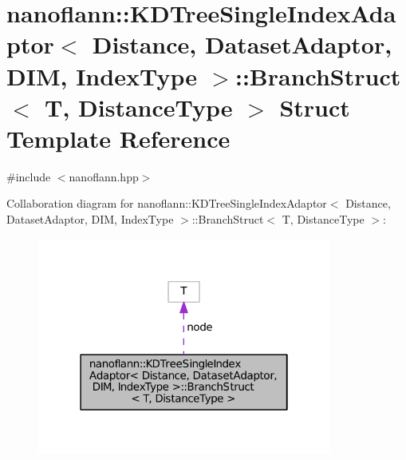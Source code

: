 \hypertarget{structnanoflann_1_1_k_d_tree_single_index_adaptor_1_1_branch_struct}{\section{nanoflann\-:\-:K\-D\-Tree\-Single\-Index\-Adaptor$<$ Distance, Dataset\-Adaptor, D\-I\-M, Index\-Type $>$\-:\-:Branch\-Struct$<$ T, Distance\-Type $>$ Struct Template Reference}
\label{structnanoflann_1_1_k_d_tree_single_index_adaptor_1_1_branch_struct}
}


{\ttfamily \#include $<$nanoflann.\-hpp$>$}



Collaboration diagram for nanoflann\-:\-:K\-D\-Tree\-Single\-Index\-Adaptor$<$ Distance, Dataset\-Adaptor, D\-I\-M, Index\-Type $>$\-:\-:Branch\-Struct$<$ T, Distance\-Type $>$\-:\nopagebreak
\begin{figure}[H]
\begin{center}
\leavevmode
\includegraphics[width=274pt]{structnanoflann_1_1_k_d_tree_single_index_adaptor_1_1_branch_struct__coll__graph}
\end{center}
\end{figure}

